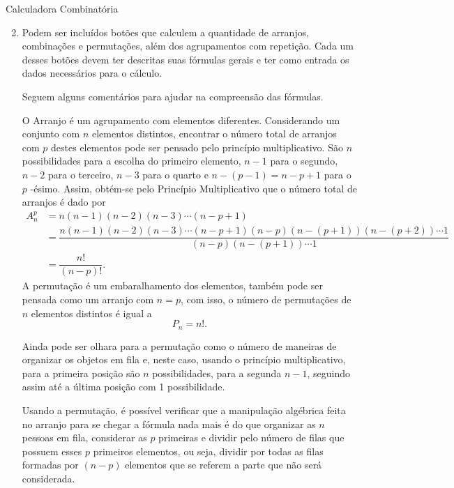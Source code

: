 \begin{answer}{Calculadora Combinatória}
{
\begin{enumerate}\setcounter{enumi}{1}
\item Podem ser incluídos botões que calculem a quantidade de arranjos, combinações e permutações, além dos agrupamentos com repetição.  Cada um desses botões devem ter descritas suas fórmulas gerais e ter como entrada os dados necessários para o cálculo.

Seguem alguns comentários para ajudar na compreensão das fórmulas.

O Arranjo é um agrupamento com elementos diferentes. Considerando um conjunto com $n$ elementos distintos, encontrar o número total de arranjos com $p$ destes elementos pode ser pensado pelo princípio multiplicativo. São $n$ possibilidades para a escolha do primeiro elemento, $n-1$ para o segundo, $n-2$ para o terceiro, $n-3$ para o quarto e $n-(p-1)=n-p+1$ para o $p$ -ésimo. Assim, obtém-se pelo Princípio Multiplicativo que o número total de arranjos é dado por 
\small
\begin{align*}
A_n^p&=n (n-1)(n-2)(n-3) \cdots (n-p+1)\\
&= \dfrac{n (n-1)(n-2)(n-3) \cdots (n-p+1)(n-p) (n-(p+1)) (n-(p+2))\cdots 1}{(n-p) (n-(p+1)) \cdots 1} \\
&= \dfrac{n!}{(n-p)!}.
\end{align*}
\normalsize
A permutação é um embaralhamento dos elementos, também pode ser pensada como um arranjo com $n=p$, com isso, o número de permutações de $n$ elementos distintos é igual a 
$$P_n=n!.$$

Ainda pode ser olhara para a permutação como o número de maneiras de organizar os objetos em fila e, neste caso, usando o princípio multiplicativo, para a primeira posição são $n$ possibilidades, para a segunda $n-1$, seguindo assim até a última posição com 1 possibilidade. 


Usando a permutação, é possível verificar que a manipulação algébrica feita no arranjo para se chegar a fórmula nada mais é do que organizar as $n$ pessoas em fila, considerar as $p$ primeiras e dividir pelo número de filas que possuem esses $p$ primeiros elementos, ou seja, dividir por todas as filas formadas por $(n-p)$ elementos que se referem a parte que não será considerada. 


\end{enumerate}}
\end{answer}
